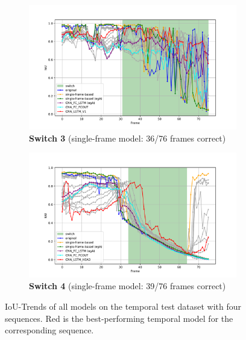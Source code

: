 \begin{figure}[H]
    \begin{subfigure}[b]{0.49\textwidth}
        \centering
        \includegraphics[width=\textwidth]{PICs/experiments/temporalModels/plot_ious_sequence_3.pdf}
        \caption{\textbf{Switch 3} (single-frame model: 36/76 frames correct)}
        \label{fig:IoUTrends_switch_3}
    \end{subfigure}
    \begin{subfigure}[b]{0.49\textwidth}
        \centering
        \includegraphics[width=\textwidth]{PICs/experiments/temporalModels/plot_ious_sequence_1.pdf}
        \caption{\textbf{Switch 4} (single-frame model: 39/76 frames correct)}
        \label{fig:IoUTrends_switch_1}
    \end{subfigure}

    \caption{\ac{IoU}-Trends of all models on the temporal test dataset with four sequences. Red is the best-performing temporal model for the corresponding sequence.}
    \label{fig:IoUTrends}
\end{figure}

